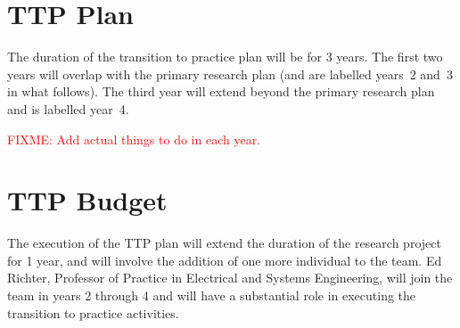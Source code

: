 \documentclass[11pt]{article}
\newcommand{\FIXME}[1]{\textcolor{red}{FIXME: #1}}
\begin{document}
\section{TTP Plan}

The duration of the transition to practice plan will be for 3 years.
The first two years will overlap with the primary research plan (and
are labelled years~2 and~3 in what follows).  The third year will extend
beyond the primary research plan and is labelled year~4.

\FIXME{Add actual things to do in each year.}

\section{TTP Budget}

The execution of the TTP plan will extend the duration of the research
project for 1 year, and will involve the addition of one more individual
to the team.  Ed Richter, Professor of Practice in Electrical and Systems
Engineering, will join the team in years 2 through 4 and will have a
substantial role in executing the transition to practice activities.
\end{document}
